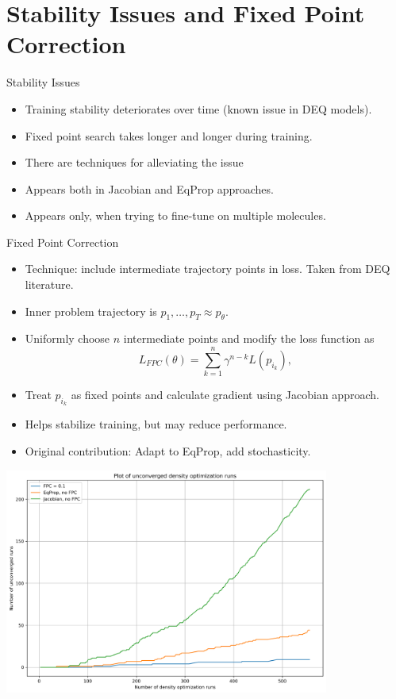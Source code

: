 \documentclass{beamer}
\begin{document}
\section{Stability Issues and Fixed Point Correction}
\begin{frame}{Stability Issues}
  \begin{itemize}
    \item Training stability deteriorates over time (known issue in DEQ models).
    \item Fixed point search takes longer and longer during training.
    \item There are techniques for alleviating the issue
    \item Appears both in Jacobian and EqProp approaches.
    \item Appears only, when trying to fine-tune on multiple molecules.
  \end{itemize}
\end{frame}

\begin{frame}{Fixed Point Correction}
  \begin{itemize}
    \item Technique: include intermediate trajectory points in loss. Taken from DEQ literature.
    \item Inner problem trajectory is $p_1, \ldots, p_T \approx p_\theta$.
    \item Uniformly choose $n$ intermediate points and modify the loss function as
    \[
      L_{FPC}(\theta) = \sum_{k=1}^{n} \gamma^{n-k} L(p_{i_k}),
    \]
    \item Treat $p_{i_k}$ as fixed points and calculate gradient using Jacobian approach.
    \item Helps stabilize training, but may reduce performance.
    \item Original contribution: Adapt to EqProp, add stochasticity.
  \end{itemize}

\end{frame}

\begin{frame}
   \begin{center}
    \includegraphics[width=0.8\textwidth]{images/stability_plot.png} %
  \end{center}
\end{frame}
\end{document}
